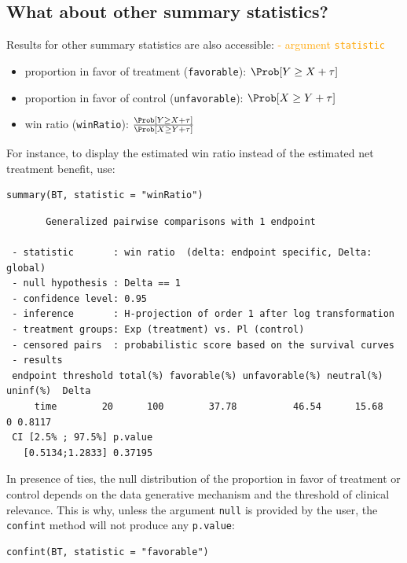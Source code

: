 \documentclass[12pt]{article}
\newcommand\Warning[1][3ex]{%
\renewcommand\stacktype{L}%
\scaleto{\stackon[1.3pt]{\color{red}$\triangle$}{\tiny\bfseries !}}{#1}%
\xspace
}
\begin{document}
\bigskip

\subsection{What about other summary statistics?}
\label{sec:org466f2f9}

Results for other summary statistics are also accessible: \hfill \textcolor{orange}{- argument \texttt{statistic}}
\begin{itemize}
\item proportion in favor of treatment (\texttt{favorable}): \(\Prob[Y\geq X + \tau]\)
\item proportion in favor of control (\texttt{unfavorable}): \(\Prob[X\geq Y + \tau]\)
\item win ratio (\texttt{winRatio}): \(\frac{\Prob[Y\geq X + \tau]}{\Prob[X\geq Y + \tau]}\)
\end{itemize}

\noindent For instance, to display the estimated win ratio instead of
the estimated net treatment benefit, use:
\lstset{language=r,label= ,caption= ,captionpos=b,numbers=none}
\begin{lstlisting}
summary(BT, statistic = "winRatio")
\end{lstlisting}

\begin{verbatim}
       Generalized pairwise comparisons with 1 endpoint

 - statistic       : win ratio  (delta: endpoint specific, Delta: global) 
 - null hypothesis : Delta == 1 
 - confidence level: 0.95 
 - inference       : H-projection of order 1 after log transformation 
 - treatment groups: Exp (treatment) vs. Pl (control) 
 - censored pairs  : probabilistic score based on the survival curves
 - results
 endpoint threshold total(%) favorable(%) unfavorable(%) neutral(%) uninf(%)  Delta
     time        20      100        37.78          46.54      15.68        0 0.8117
 CI [2.5% ; 97.5%] p.value 
   [0.5134;1.2833] 0.37195
\end{verbatim}

\Warning In presence of ties, the null distribution of the proportion
in favor of treatment or control depends on the data generative
mechanism and the threshold of clinical relevance. This is why, unless
the argument \texttt{null} is provided by the user, the \texttt{confint} method will
not produce any \texttt{p.value}:
\lstset{language=r,label= ,caption= ,captionpos=b,numbers=none}
\begin{lstlisting}
confint(BT, statistic = "favorable")
\end{lstlisting}
\end{document}
